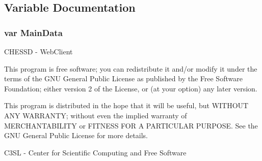 \subsection{Variable Documentation}
\subsubsection[MainData]{\setlength{\rightskip}{0pt plus 5cm}var {\bf MainData}}\label{start_8js_be4e3545ee0ac3ff17e7aecaff4fce1a}


CHESSD - WebClient

This program is free software; you can redistribute it and/or modify it under the terms of the GNU General Public License as published by the Free Software Foundation; either version 2 of the License, or (at your option) any later version.

This program is distributed in the hope that it will be useful, but WITHOUT ANY WARRANTY; without even the implied warranty of MERCHANTABILITY or FITNESS FOR A PARTICULAR PURPOSE. See the GNU General Public License for more details.

C3SL - Center for Scientific Computing and Free Software 

